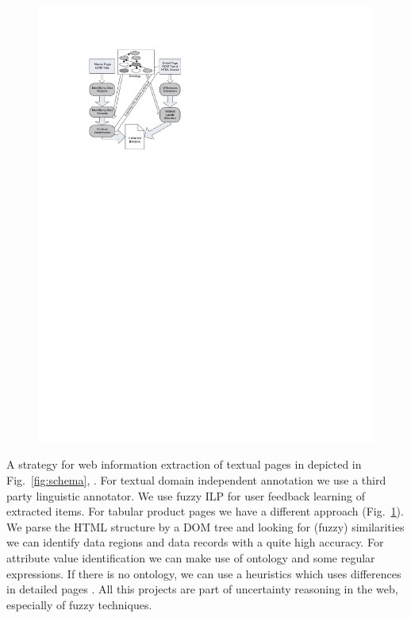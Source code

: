 \begin{figure}[ht]
\begin{minipage}[b]{0.5\hsize}
		\includegraphics[width=\hsize]{img/mdr}
\caption{}
\label{fig:mdr}
\end{minipage}
\end{figure}


     A strategy for web information extraction of textual pages in depicted in Fig.~\ref{fig:schema}, \cite{35}. For textual domain independent annotation we use a third party linguistic annotator. We use fuzzy ILP for user feedback learning of extracted items. For tabular product pages we have a different approach (Fig.~\ref{fig:mdr}). We parse the HTML structure by a DOM tree and looking for (fuzzy) similarities we can identify data regions and data records with a quite high accuracy.  For attribute value identification we can make use of ontology and some regular expressions. If there is no ontology, we can use a heuristics which uses differences in detailed pages \cite{41}. All this projects are part of uncertainty reasoning in the web, especially of fuzzy techniques. 

